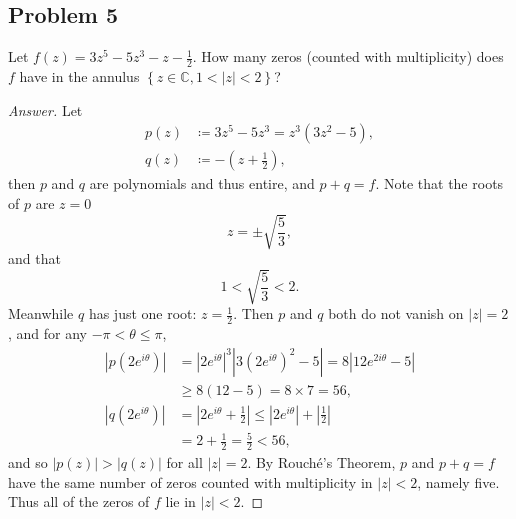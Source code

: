 \documentclass[12pt]{article}
\newcommand{\cx}{\mathbb{C}}
\newcommand\paren[1]{\left( #1 \right)}
\newcommand\setb[1]{\left \{ #1 \right \}}
\newcommand{\abs}[1]{\left| #1 \right|}
\theoremstyle{definition}
\begin{document}
\subsection{Problem 5}
Let $f(z) = 3z^5 - 5z^3 - z - \frac{1}{2}$. How many zeros (counted with multiplicity) does $f$ have in the annulus $\setb{ z \in \cx , 1 < |z| < 2}$?
\begin{proof}[Answer]
    Let 
    \begin{align*}
        p(z) & \coloneqq 3z^5 - 5z^3 = z^3 \paren{ 3z^2 - 5 } , \\ 
        q(z) & \coloneqq - \paren{ z + \frac{1}{2} } , 
    \end{align*}
    then $p$ and $q$ are polynomials and thus entire, and $p + q = f$. Note that the roots of $p$ are $z = 0$ 
    \[
        z = \pm \sqrt{ \frac{5}{3} } , 
    \]
    and that 
    \[
        1 < \sqrt{ \frac{5}{3} } < 2 . 
    \]
    Meanwhile $q$ has just one root: $z = \frac{1}{2}$. Then $p$ and $q$ both do not vanish on $\abs{z} = {2}$, and for any $-\pi < \theta \leq \pi$, 
    \begin{align*}
        \abs{ p \paren{ 2e^{i\theta} } } & = \abs{ 2e^{i\theta} }^3 \abs{ 3 \paren{ 2e^{i\theta} }^2 - 5 } = 8 \abs{ 12 e^{2i\theta} - 5 } \\ 
        & \geq 8(12 - 5) = 8 \times 7 = 56 , \\ 
        \abs{ q \paren{ 2e^{i\theta} } } & = \abs{ 2e^{i\theta} + \frac{1}{2} } \leq \abs{ 2e^{i\theta} } + \abs{ \frac{1}{2} } \\ 
        & = 2 + \frac{1}{2} = \frac{5}{2} < 56 ,
    \end{align*}
    and so $\abs{ p(z) } > \abs{ q(z) }$ for all $\abs{ z } = 2$. By Rouch\'e's Theorem, $p$ and $p + q = f$ have the same number of zeros counted with multiplicity in $\abs{z} < 2$, namely five. Thus all of the zeros of $f$ lie in $\abs{z} < 2$. 
    

\end{proof}
\end{document}
